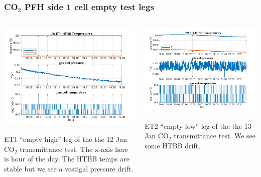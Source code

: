 \documentclass[10pt]{beamer}
\begin{document}
\begin{frame}
\frametitle{CO$_2$ PFH side 1 cell empty test legs}
\begin{columns}[t]
\begin{column}{0.5\textwidth}
  \begin{centering}
  \includegraphics[width=\textwidth]{harvest_01-12/01-12_LW_ET1.png}
  \end{centering}\vspace{3mm}

  ET1 ``empty high'' leg of the the 12 Jan CO$_2$ transmittance test.
  The x-axis here is hour of the day.  The HTBB temps are stable but
  we see a vestigal pressure drift.

\end{column}
\begin{column}{0.5\textwidth}  
  \begin{centering}
  \includegraphics[width=\textwidth]{harvest_01-12/01-12_LW_ET2.png}
  \end{centering}\vspace{3mm}

  ET2 ``empty low'' leg of the the 13 Jan CO$_2$ transmittance test.
  We see some HTBB drift.

\end{column}
\end{columns}
\end{frame}
\end{document}
